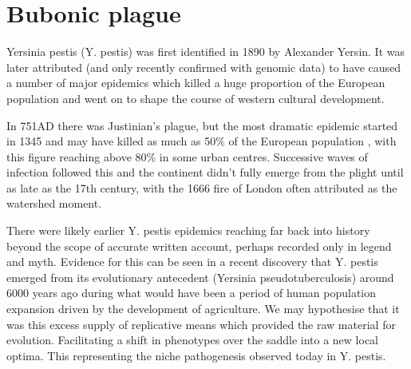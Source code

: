 \section{Bubonic plague}
Yersinia pestis (Y. pestis) was first identified in 1890 by Alexander Yersin. It was later attributed (and only recently confirmed with genomic data) to have caused a number of major epidemics which killed a huge proportion of the European population and went on to shape the course of western cultural development. 


In 751AD there was Justinian's plague, but the most dramatic epidemic started in 1345 and may have killed as much as 50\% of the European population \cite{belich2022world}, with this figure reaching above 80\% in some urban centres. Successive waves of infection followed this and the continent didn't fully emerge from the plight until as late as the 17th century, with the 1666 fire of London often attributed as the watershed moment.\par
There were likely earlier Y. pestis epidemics reaching far back into history beyond the scope of accurate written account, perhaps recorded only in legend and myth. Evidence for this can be seen in a recent discovery that Y. pestis emerged from its evolutionary antecedent (Yersinia pseudotuberculosis) around 6000 years ago during what would have been a period of human population expansion driven by the development of agriculture. We may hypothesise that it was this excess supply of replicative means which provided the raw material for evolution. Facilitating a shift in phenotypes over the saddle into a new local optima. This representing the niche pathogenesis observed today in Y. pestis.
